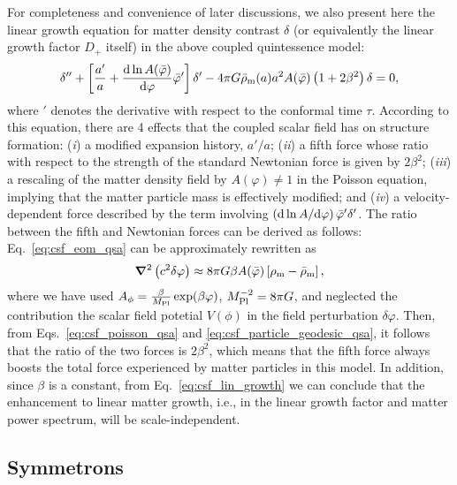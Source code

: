 For completeness and convenience of later discussions, we also present here the linear growth equation for matter density contrast $\delta$ (or equivalently the linear growth factor $D_+$ itself) in the above coupled quintessence model:
\begin{equation}\label{eq:csf_lin_growth}
    \delta'' + \left[\frac{a'}{a}+\frac{{\rm d}\ln{A}(\bar{\varphi})}{{\rm d}\varphi}\bar{\varphi}'\right]\delta' - 4\pi{G}\bar{\rho}_{\rm m}(a){a}^2A(\bar{\varphi})\left(1+2\beta^2\right)\delta = 0,
\end{equation}
where $'$ denotes the derivative with respect to the conformal time $\tau$. According to this equation, there are 4 effects that the coupled scalar field has on structure formation: (\textit{i}) a modified expansion history, $a'/a$; (\textit{ii}) a fifth force whose ratio with respect to the strength of the standard Newtonian force is given by $2\beta^2$; (\textit{iii}) a rescaling of the matter density field by $A(\varphi)\neq1$ in the Poisson equation, implying that the matter particle mass is effectively modified; and (\textit{iv}) a velocity-dependent force described by the term involving $\left({\rm d}\ln A/{\rm d}\varphi\right)\bar{\varphi}'\delta'$. The ratio between the fifth and Newtonian forces can be derived as follows: Eq.~\eqref{eq:csf_eom_qsa} can be approximately rewritten as
\begin{equation}\label{eq:csf_eom_qsa_approx}
    \boldsymbol{\nabla}^2\left(c^2\delta\varphi\right) \approx 8\pi G \beta A(\bar{\varphi})\left[\rho_{\rm m} - \bar{\rho}_{\rm m}\right],
\end{equation}
where we have used $A_\phi=\frac{\beta}{M_{\rm Pl}}\exp(\beta\varphi)$, $M_{\rm Pl}^{-2}=8\pi G$, and neglected the contribution the scalar field potetial $V(\phi)$ in the field perturbation $\delta\varphi$. Then, from Eqs.~\eqref{eq:csf_poisson_qsa} and \eqref{eq:csf_particle_geodesic_qsa}, it follows that the ratio of the two forces is $2\beta^2$, which means that the fifth force always boosts the total force experienced by matter particles in this model. In addition, since $\beta$ is a constant, from Eq.~\eqref{eq:csf_lin_growth} we can conclude that the enhancement to linear matter growth, i.e., in the linear growth factor and matter power spectrum, will be scale-independent.

\subsection{Symmetrons}
\label{subsect:sym}

